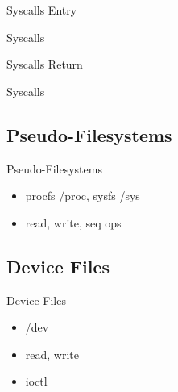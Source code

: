 \documentclass{workshop}
\begin{document}
\begin{frame}{Syscalls Entry}

\end{frame}

\begin{frame}{Syscalls}

\end{frame}

\begin{frame}{Syscalls Return}

\end{frame}

\begin{frame}{Syscalls}

\end{frame}

\subsection{Pseudo-Filesystems}
\begin{frame}{Pseudo-Filesystems}
\begin{itemize}
\item procfs /proc, sysfs /sys
\item read, write, seq ops
\end{itemize}
\end{frame}

\subsection{Device Files}
\begin{frame}{Device Files}
\begin{itemize}
\item /dev
\item read, write
\item ioctl
\end{itemize}
\end{frame}
\end{document}

